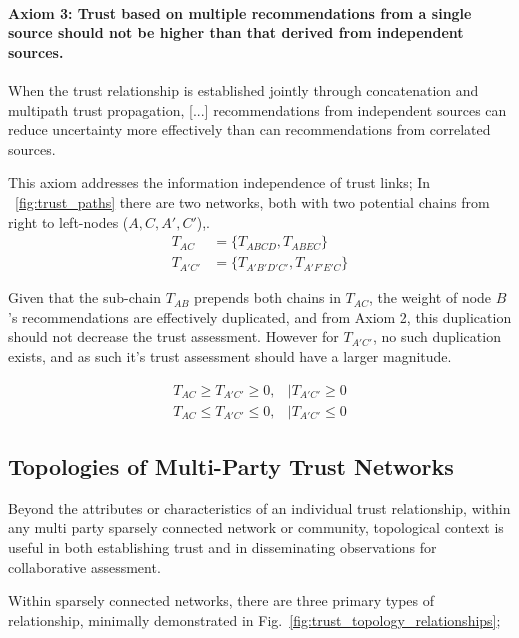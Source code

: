 \paragraph{Axiom 3: Trust based on multiple recommendations from a single source should not be higher than that derived from independent sources.}

\begin{displayquote}
	When the trust relationship is established jointly through concatenation and multipath trust propagation, [...] recommendations from independent sources can reduce uncertainty more effectively than can recommendations from correlated sources.
\end{displayquote}

This axiom addresses the information independence of trust links; In ~\autoref{fig:trust_paths} there are two networks, both with two potential chains from right to left-nodes ($A,C,A',C'$),.
\begin{align}
T_{AC}&=\{T_{ABCD}, T_{ABEC}\}\\
T_{A'C'}&=\{T_{A'B'D'C'}, T_{A'F'E'C}\}
\end{align}

Given that the sub-chain $T_{AB}$ prepends both chains in $T_{AC}$, the weight of node $B$'s recommendations are effectively duplicated, and from Axiom 2, this duplication should not decrease the trust assessment.
However for $T_{A'C'}$, no such duplication exists, and as such it's trust assessment should have a larger magnitude.

\begin{align}
T_{AC} \geq T_{A'C'} \geq 0, &| T_{A'C'} \geq 0\\
T_{AC} \leq T_{A'C'} \leq 0, &| T_{A'C'} \le 0
\end{align}


\subsection{Topologies of Multi-Party Trust Networks}\label{sec:trust_topologies}
Beyond the attributes or characteristics of an individual trust relationship, within any multi party sparsely connected network or community, topological context is useful in both establishing trust and in disseminating observations for collaborative assessment.

Within sparsely connected networks, there are three primary types of relationship, minimally demonstrated in Fig.~\ref{fig:trust_topology_relationships};

